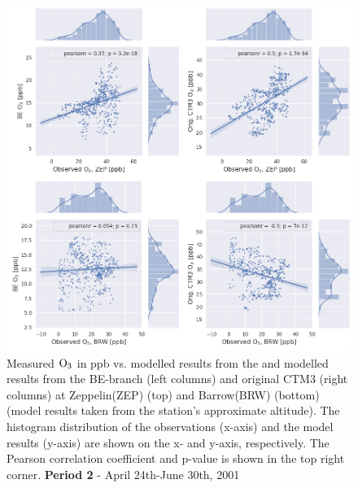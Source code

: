 \begin{figure}[ht]
    \centering
    \includegraphics[width = \linewidth]{Chapter6_Results/images/Orig_BE_comp/jointplot_AprJune_ZEPBRW_O3_2001.png}
    \caption{Measured $\mathrm{O_3}$ in ppb vs. modelled results from the and modelled results from the BE-branch (left columns) and original CTM3 (right columns) at  Zeppelin(ZEP) (top) and Barrow(BRW) (bottom) (model results taken from the station's approximate altitude). The histogram distribution of the observations (x-axis) and the model results (y-axis) are shown on the x- and y-axis, respectively. The Pearson correlation coefficient and p-value is shown in the top right corner. \textbf{Period 2} - April 24th-June 30th, 2001}
    \label{fig:joint_AprMay_ZEPBRW}
\end{figure}